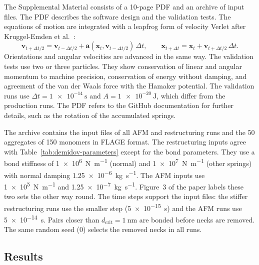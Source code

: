 \documentclass[11pt,a4paper]{article}
\begin{document}
The Supplemental Material consists of a 10-page PDF and an archive of input files.
The PDF describes the software design and the validation tests.
The equations of motion are integrated with a leapfrog form of velocity Verlet after Kruggel-Emden et al.~\cite{kruggel2008}:
\begin{equation}
  \bm{v}_{t+\Delta t/2} = \bm{v}_{t-\Delta t/2} + \bm{a}(\bm{x}_t, \bm{v}_{t-\Delta t/2})\,\Delta t , \qquad
  \bm{x}_{t+\Delta t} = \bm{x}_t + \bm{v}_{t+\Delta t/2}\,\Delta t .
  \label{eq:leapfrog}
\end{equation}
Orientations and angular velocities are advanced in the same way.
The validation tests use two or three particles.
They show conservation of linear and angular momentum to machine precision, conservation of energy without damping, and agreement of the van der Waals force with the Hamaker potential.
The validation runs use $\Delta t = \SI{1e-14}{\second}$ and $A = \SI{1e-20}{\joule}$, which differ from the production runs.
The PDF refers to the GitHub documentation for further details, such as the rotation of the accumulated springs.

The archive contains the input files of all AFM and restructuring runs and the 50 aggregates of 150 monomers in FLAGE format.
The restructuring inputs agree with Table~\ref{tab:demidov-parameters} except for the bond parameters.
They use a bond stiffness of \SI{1e6}{\newton\per\meter} (normal) and \SI{1e7}{\newton\per\meter} (other springs) with normal damping \SI{1.25e-6}{\kilo\gram\per\second}.
The AFM inputs use \SI{1e5}{\newton\per\meter} and \SI{1.25e-7}{\kilo\gram\per\second}.
Figure~3 of the paper labels these two sets the other way round.
The time steps support the input files: the stiffer restructuring runs use the smaller step (\SI{5e-15}{\second}) and the AFM runs use \SI{5e-14}{\second}.
Pairs closer than $d_\text{crit} = \SI{1}{\nano\meter}$ are bonded before necks are removed.
The same random seed (0) selects the removed necks in all runs.

\subsection{Results}
\label{sec:results}
\end{document}
